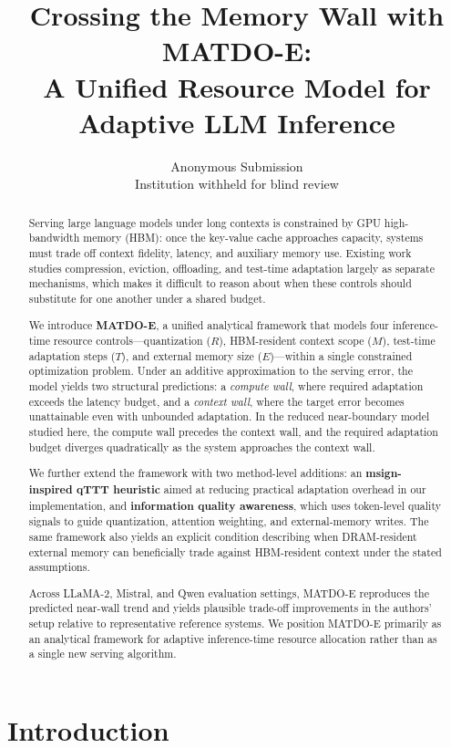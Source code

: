 \documentclass[11pt,a4paper]{article}
\author{Anonymous Submission\\Institution withheld for blind review}
\title{Crossing the Memory Wall with MATDO-E:\\A Unified Resource Model for Adaptive LLM Inference}
\date{}
\theoremstyle{plain}
\theoremstyle{definition}
\begin{document}
\maketitle

\begin{abstract}
Serving large language models under long contexts is constrained by GPU high-bandwidth memory (HBM): once the key-value cache approaches capacity, systems must trade off context fidelity, latency, and auxiliary memory use. Existing work studies compression, eviction, offloading, and test-time adaptation largely as separate mechanisms, which makes it difficult to reason about when these controls should substitute for one another under a shared budget.

We introduce \textbf{MATDO-E}, a unified analytical framework that models four inference-time resource controls---quantization ($R$), HBM-resident context scope ($M$), test-time adaptation steps ($T$), and external memory size ($E$)---within a single constrained optimization problem. Under an additive approximation to the serving error, the model yields two structural predictions: a \emph{compute wall}, where required adaptation exceeds the latency budget, and a \emph{context wall}, where the target error becomes unattainable even with unbounded adaptation. In the reduced near-boundary model studied here, the compute wall precedes the context wall, and the required adaptation budget diverges quadratically as the system approaches the context wall.

We further extend the framework with two method-level additions: an \textbf{msign-inspired qTTT heuristic} aimed at reducing practical adaptation overhead in our implementation, and \textbf{information quality awareness}, which uses token-level quality signals to guide quantization, attention weighting, and external-memory writes. The same framework also yields an explicit condition describing when DRAM-resident external memory can beneficially trade against HBM-resident context under the stated assumptions.

Across LLaMA-2, Mistral, and Qwen evaluation settings, MATDO-E reproduces the predicted near-wall trend and yields plausible trade-off improvements in the authors' setup relative to representative reference systems. We position MATDO-E primarily as an analytical framework for adaptive inference-time resource allocation rather than as a single new serving algorithm.
\end{abstract}

\section{Introduction}
\end{document}

